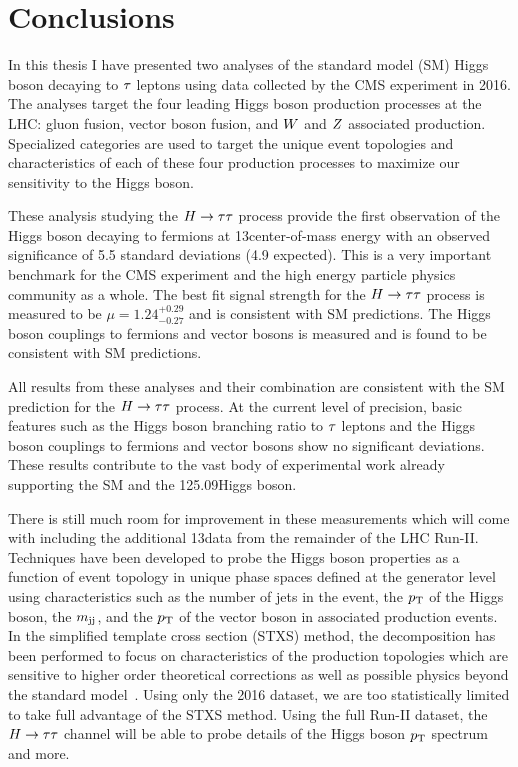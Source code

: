 \chapter{Conclusions}
\label{sec:conclusion}

In this thesis I have presented two analyses of the standard model (SM) Higgs boson decaying to $\tau$
leptons using data collected by the CMS experiment in 2016.
The analyses target the four leading Higgs boson production processes at the LHC:
gluon fusion, vector boson fusion, and $W$ and $Z$ associated production.
Specialized categories are used to target the unique event topologies and 
characteristics of each of these four production processes to maximize our
sensitivity to the Higgs boson. 

These analysis studying the $H\to\tau\tau$ process provide the first 
observation of the Higgs boson decaying to fermions at 13\TeV center-of-mass energy
with an observed significance of 5.5 standard deviations (4.9 expected). 
This is a very important benchmark for the CMS experiment and the high energy
particle physics community as a whole.
The best fit signal strength for the $H\to\tau\tau$ process is measured to be 
$\mu = 1.24 ^{+0.29} _{-0.27}$ and is consistent with SM predictions.
The Higgs boson couplings to fermions and vector bosons is measured and is found to be
consistent with SM predictions.

All results from these analyses and their combination are consistent
with the SM prediction for the $H\to\tau\tau$ process. At the current level of precision,
basic features such as the Higgs boson branching ratio to $\tau$ leptons and the
Higgs boson couplings to fermions and vector bosons show no significant
deviations. These results contribute to the vast body of experimental work
already supporting the SM and the 125.09\GeV Higgs boson.

There is still much room for improvement in these measurements which will come with
including the additional 13\TeV data from the remainder of the LHC Run-II. 
Techniques have been developed to probe the Higgs boson properties as a function
of event topology in unique phase spaces defined at the generator 
level using characteristics such as the number of jets
in the event, the $p_\mathrm{T}$ of the Higgs boson, the $m_\mathrm{jj}$, and the $p_\mathrm{T}$ of the
vector boson in associated production events. In the simplified template
cross section (STXS) method, the decomposition has been performed to focus on 
characteristics of the production topologies which are sensitive to higher
order theoretical corrections as well as possible physics beyond the standard
model~\cite{Tackmann:2138079}. Using only the 2016 dataset, we are too
statistically limited to take full advantage of the STXS method. Using the
full Run-II dataset, the $H\to\tau\tau$ channel will be able to probe details of the
Higgs boson $p_\mathrm{T}$ spectrum and more.

